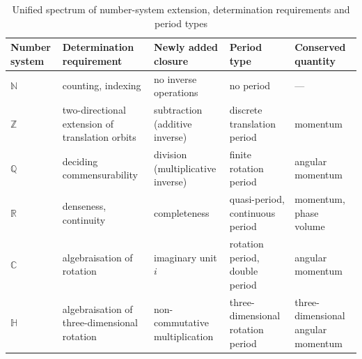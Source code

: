 \begin{table}[htbp]
\centering
\caption{Unified spectrum of number-system extension, determination requirements and period types}
\label{tab:number_system_period_spectrum}
\small
\begin{tabularx}{\textwidth}{@{}>{\raggedright\arraybackslash}p{1.6cm}
                  >{\raggedright\arraybackslash}X
                  >{\raggedright\arraybackslash}X
                  >{\raggedright\arraybackslash}X
                  >{\raggedright\arraybackslash}X@{}}
\toprule
\textbf{Number system} & \textbf{Determination requirement} & \textbf{Newly added closure} & \textbf{Period type} & \textbf{Conserved quantity} \\
\midrule
$\mathbb{N}$ & counting, indexing & no inverse operations & no period & --- \\
$\mathbb{Z}$ & two-directional extension of translation orbits & subtraction (additive inverse) & discrete translation period & momentum \\
$\mathbb{Q}$ & deciding commensurability & division (multiplicative inverse) & finite rotation period & angular momentum \\
$\mathbb{R}$ & denseness, continuity & completeness & quasi-period, continuous period & momentum, phase volume \\
$\mathbb{C}$ & algebraisation of rotation & imaginary unit $i$ & rotation period, double period & angular momentum \\
$\mathbb{H}$ & algebraisation of three-dimensional rotation & non-commutative multiplication & three-dimensional rotation period & three-dimensional angular momentum \\
\bottomrule
\end{tabularx}
\end{table}

